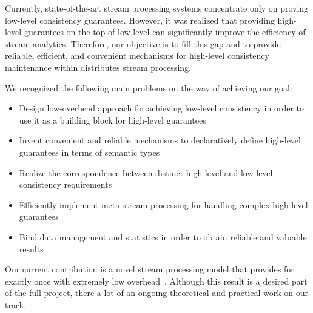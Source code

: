 \label{fs-phd-summary}

Currently, state-of-the-art stream processing systems concentrate only on proving low-level consistency guarantees. However, it was realized that providing high-level guarantees on the top of low-level can significantly improve the efficiency of stream analytics. Therefore, our objective is to fill this gap and to provide reliable, efficient, and convenient mechanisms for high-level consistency maintenance within distributes stream processing.

We recognized the following main problems on the way of achieving our goal:

\begin{itemize}
    \item Design low-overhead approach for achieving low-level consistency in order to use it as a building block for high-level guarantees  
    \item Invent convenient and reliable mechanisms to declaratively define high-level guarantees in terms of semantic types
    \item Realize the correspondence between distinct high-level and low-level consistency requirements
    \item Efficiently implement meta-stream processing for handling complex high-level guarantees
    \item Bind data management and statistics in order to obtain reliable and valuable results  
\end{itemize}

Our current contribution is a novel stream processing model that provides for exactly once with extremely low overhead~\cite{we2018seim, we2018beyondmr}. Although this result is a desired part of the full project, there a lot of an ongoing theoretical and practical work on our track.   